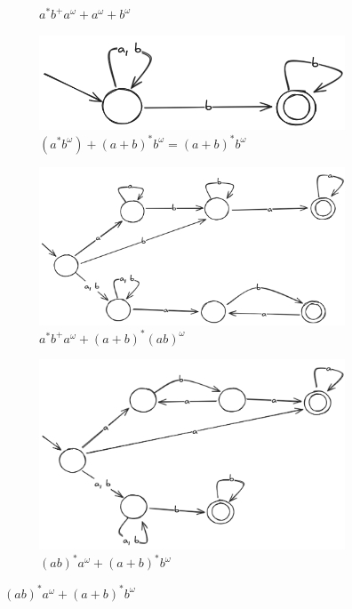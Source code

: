 \documentclass{article}
\begin{document}
\begin{figure}[!htb]
\begin{subfigure}[b]{0.4\textwidth}
		\caption{$a^*b^+a^\omega + a^\omega + b^\omega$}
	\end{subfigure}
	\hfil
	\begin{subfigure}[b]{0.3\textwidth}
		\centering
		\includegraphics[width=\textwidth]{04-10-10.png}
		\caption{$(a^*b^\omega) + (a + b)^*b^\omega = (a + b)^*b^\omega$}
	\end{subfigure}
	\hfil
	\begin{subfigure}[b]{0.4\textwidth}
		\centering
		\includegraphics[width=\textwidth]{04-10-11.png}
		\caption{$a^*b^+a^\omega + (a + b)^*(ab)^\omega$}
	\end{subfigure}
	\hfil
	\begin{subfigure}[b]{0.35\textwidth}
		\centering
		\includegraphics[width=\textwidth]{04-10-12.png}
		\caption{$(ab)^*a^\omega + (a + b)^*b^\omega$}
	\end{subfigure}
\end{figure}
\end{document}
